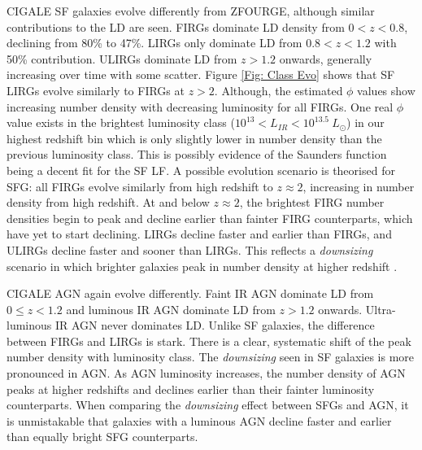 CIGALE SF galaxies evolve differently from ZFOURGE, although similar contributions to the LD are seen. FIRGs dominate LD density from $0<z<0.8$, declining from 80\% to 47\%. LIRGs only dominate LD from $0.8<z<1.2$ with 50\% contribution. ULIRGs dominate LD from $z>1.2$ onwards, generally increasing over time with some scatter. Figure \ref{Fig: Class Evo} shows that SF LIRGs evolve similarly to FIRGs at $z>2$. Although, the estimated $\phi$ values show increasing number density with decreasing luminosity for all FIRGs. One real $\phi$ value exists in the brightest luminosity class ($10^{13} < L_{IR} < 10^{13.5}\ L_{\odot}$) in our highest redshift bin which is only slightly lower in number density than the previous luminosity class. This is possibly evidence of the Saunders function being a decent fit for the SF LF. A possible evolution scenario is theorised for SFG: all FIRGs evolve similarly from high redshift to $z \approx 2$, increasing in number density from high redshift. At and below $z \approx 2$, the brightest FIRG number densities begin to peak and decline earlier than fainter FIRG counterparts, which have yet to start declining. LIRGs decline faster and earlier than FIRGs, and ULIRGs decline faster and sooner than LIRGs. This reflects a \textit{downsizing} scenario in which brighter galaxies peak in number density at higher redshift \citep{merloni_synthesis_2008, wylezalek_galaxy_2014, fiore_agn_2017}.

CIGALE AGN again evolve differently. Faint IR AGN dominate LD from $0 \leq z < 1.2$ and luminous IR AGN dominate LD from $z>1.2$ onwards. Ultra-luminous IR AGN never dominates LD. Unlike SF galaxies, the difference between FIRGs and LIRGs is stark. There is a clear, systematic shift of the peak number density with luminosity class. The \textit{downsizing} seen in SF galaxies is more pronounced in AGN. As AGN luminosity increases, the number density of AGN peaks at higher redshifts and declines earlier than their fainter luminosity counterparts. When comparing the \textit{downsizing} effect between SFGs and AGN, it is unmistakable that galaxies with a luminous AGN decline faster and earlier than equally bright SFG counterparts.



